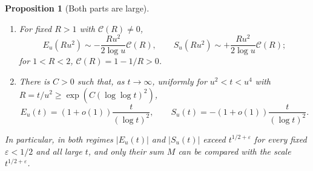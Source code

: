 \documentclass[11pt]{amsart}
\numberwithin{equation}{section}
\theoremstyle{plain}
\newtheorem{proposition}[theorem]{Proposition}
\theoremstyle{definition}
\theoremstyle{remark}
\newcommand{\eps}{\varepsilon}
\newcommand{\Cc}{\mathcal{C}}
\begin{document}
\begin{proposition}[Both parts are large]
\label{prop:both_parts_large}
\begin{enumerate}[label=\textup{(\roman*)}]
\item For fixed $R>1$ with $\Cc(R)\ne0$,
\begin{equation}
\label{eq:E_fixed_R_size}
  E_u(Ru^2)\sim-\frac{Ru^2}{2\log u}\Cc(R),\qquad
  S_u(Ru^2)\sim+\frac{Ru^2}{2\log u}\Cc(R);
\end{equation}
for $1<R<2$, $\Cc(R)=1-1/R>0$.
\item There is $C>0$ such that, as $t\to\infty$, uniformly for $u^2<t<u^4$
with $R=t/u^2\ge\exp(C(\log\log t)^2)$,
\begin{equation}
\label{eq:E_log2}
  E_u(t)=(1+o(1))\frac{t}{(\log t)^2},\qquad
  S_u(t)=-(1+o(1))\frac{t}{(\log t)^2}.
\end{equation}
\end{enumerate}
In particular, in both regimes $|E_u(t)|$ and $|S_u(t)|$ exceed
$t^{1/2+\eps}$ for every fixed $\eps<1/2$ and all large $t$, and only their
sum $M$ can be compared with the scale $t^{1/2+\eps}$.
\end{proposition}
\end{document}
